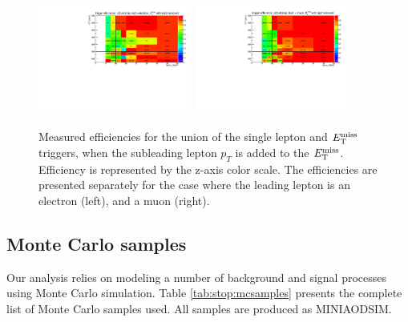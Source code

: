 \begin{figure}[htb]
\centering
\includegraphics[width=0.45\textwidth]{figures/TriggerEff2l_el.pdf}
\includegraphics[width=0.45\textwidth]{figures/TriggerEff2l_mu.pdf}
\caption{Measured efficiencies for the union of the single lepton and
  $E_\text{T}^\text{miss}$ triggers, when the subleading lepton $p_T$ is added to the
  $E_\text{T}^\text{miss}$. Efficiency is represented by the z-axis color scale. The
  efficiencies are presented separately for the case where
  the leading lepton is an electron (left), and a muon (right).}
\label{fig:stop:trigeff:2ndlepplusmet}
\end{figure}


\subsection{Monte Carlo samples}
\label{ssec:stop:mcsamples}

Our analysis relies on modeling a number of background and signal
processes using Monte Carlo simulation. Table \ref{tab:stop:mcsamples}
presents the complete list of Monte Carlo samples used. All samples
are produced as MINIAODSIM.

